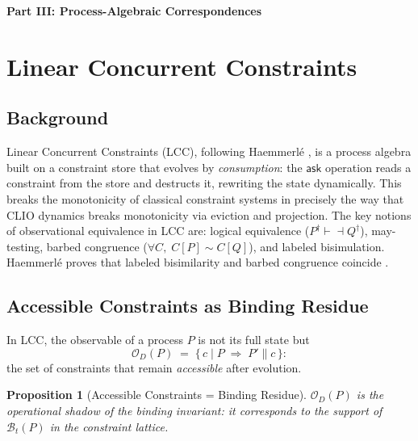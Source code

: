 \documentclass[11pt, letterpaper]{article}
\theoremstyle{plain}
\newtheorem{proposition}[theorem]{Proposition}
\theoremstyle{definition}
\theoremstyle{remark}
\newcommand{\BI}{\mathcal{B}}
\newcommand{\OO}{\mathcal{O}}
\begin{document}

\vspace{1.2em}
\begin{center}{\large\bfseries Part III: Process-Algebraic Correspondences}\end{center}
\vspace{0.5em}

\section{Linear Concurrent Constraints}

\subsection{Background}

Linear Concurrent Constraints (LCC), following Haemmerl\'e \cite{haemmerle2011}, is a
process algebra built on a constraint store that evolves by \emph{consumption}: the
$\mathsf{ask}$ operation reads a constraint from the store and destructs it, rewriting
the state dynamically. This breaks the monotonicity of classical constraint systems
\cite{saraswat} in precisely the way that CLIO dynamics breaks monotonicity via
eviction and projection. The key notions of observational equivalence in LCC are:
logical equivalence ($P^\dagger \vdash\dashv Q^\dagger$), may-testing, barbed
congruence ($\forall C,\; C[P] \sim C[Q]$), and labeled bisimulation. Haemmerl\'e
proves that labeled bisimilarity and barbed congruence coincide \cite{haemmerle2011}.

\subsection{Accessible Constraints as Binding Residue}

In LCC, the observable of a process $P$ is not its full state but
\[
  \OO_D(P) \;=\; \{\, c \mid P \;\Rightarrow\; P' \parallel c \,\}:
\]
the set of constraints that remain \emph{accessible} after evolution.

\begin{proposition}[Accessible Constraints = Binding Residue]
$\OO_D(P)$ is the operational shadow of the binding invariant: it corresponds to the
support of $\BI_t(P)$ in the constraint lattice.
\end{proposition}
\end{document}
